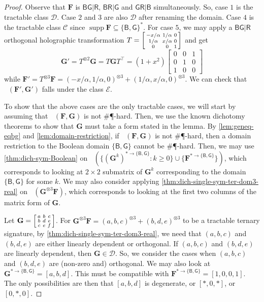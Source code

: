 \documentclass[11pt]{article}
\DeclareMathOperator{\hols}{Holant^*}
\DeclareMathOperator{\holts}{Holant^*_3}
\DeclareMathOperator{\supp}{supp}
\newcommand{\db}{\mathsf{B}}
\newcommand{\dg}{\mathsf{G}}
\newcommand{\dr}{\mathsf{R}}
\newcommand{\sph}{\#\P-hard\xspace}
\newcommand{\teh}{^{\otimes 3}}
\newcommand{\tew}{^{\otimes 2}}
\newcommand{\transpose}{^\intercal}
\newcommand{\domres}[1]{
  ^{*\to\{#1\}}
}
\newcommand{\bdgr}{\dg \dr | \db}
\newcommand{\tractBG}{$\mathscr{C}$\xspace}
\newcommand{\tractBGR}{$\mathscr{D}$\xspace}
\newcommand{\tractBGGRBR}{$\mathscr{E}$\xspace}
\begin{document}
\begin{proof}
  Observe that $\mathbf{F}$ is $\db \dg | \dr$, $\db \dr | \dg$ and $\bdgr$ simultaneously.
  So, case $1$ is the tractable class \tractBGR.
  Case $2$ and $3$ are also \tractBGR after renaming the domain.
  Case $4$ is the tractable class \tractBG since $\supp \mathbf{F} \subseteq \{\db, \dg\}^*$.
  For case $5$, we may apply a $\db \dg | \dr$ orthogonal holographic transformation $T = \begin{bsmallmatrix}
    -x/\alpha & 1/\alpha & 0 \\
    1/\alpha & x/\alpha & 0 \\
    0 & 0 & 1
  \end{bsmallmatrix}$ and get
  \[
    \mathbf{G}' = T \tew \mathbf{G} = T \mathbf{G} T\transpose = (1 + x^2) \begin{bmatrix}
      0 & 0 & 1 \\
      0 & 1 & 0 \\
      1 & 0 & 0
    \end{bmatrix}
  \] while $\mathbf{F}' = T \teh \mathbf{F} = (-x/\alpha, 1/\alpha, 0) \teh + (1/\alpha, x/\alpha, 0) \teh$.
We can check that $\hols(\mathbf{F}', \mathbf{G}')$ falls under the class \tractBGGRBR.

  To show that the above cases are the only tractable cases, we will start by assuming that $\holts(\mathbf{F}, \mathbf{G})$ is not \sph.
  Then, we use the known dichotomy theorems to show that $\mathbf{G}$ must take a form stated in the lemma. 
  By \cref{lem:geneq-eqbg} and \cref{lem:domain-restriction}, if $\holts(\mathbf{F}, \mathbf{G})$ is not \sph, then a domain restriction to the Boolean domain $\{\db, \dg\}$ cannot be \sph. 
Then, we may use \cref{thm:dich-sym-Boolean} on $\hols(\{(\mathbf{G}^k)\domres{\db, \dg} : k \ge 0\}  \cup \{\mathbf{F} \domres{\db, \dg}\})$, which corresponds to looking at $2 \times 2$ submatrix of $\mathbf{G}^k$ corresponding to the domain $\{\db, \dg\}$ for some $k$.
  We may also consider applying \cref{thm:dich-single-sym-ter-dom3-real} on $\holts(\mathbf{G} \teh \mathbf{F})$, which corresponds to looking at the first two columns of the matrix form of $\mathbf{G}$.

  Let $
    \mathbf{G} = \begin{bsmallmatrix}
      a & b & c \\
      b & d & e \\
      c & e & f
    \end{bsmallmatrix}$. 
  For $\mathbf{G}\teh \mathbf{F} = (a, b, c)\teh + (b, d, e)\teh$ to be a tractable ternary signature, by \cref{thm:dich-single-sym-ter-dom3-real}, we need that $(a, b, c)$ and $(b, d, e)$ are either linearly dependent or orthogonal.
  If $(a, b, c)$ and $(b, d, e)$ are linearly dependent, then $\mathbf{G} \in \mathcal{D}$.
  So, we consider the cases when $(a, b, c)$ and $(b, d, e)$ are (non-zero and)
  orthogonal.
We may also look at $\mathbf{G}\domres{\db, \dg} = [a, b, d]$. 
  This must be compatible with $\mathbf{F}\domres{\db, \dg} = [1, 0, 0, 1]$.
  The only possibilities are then that $[a, b, d]$ is degenerate, or $[*, 0, *]$, or $[0, *, 0]$.


\end{proof}
\end{document}
